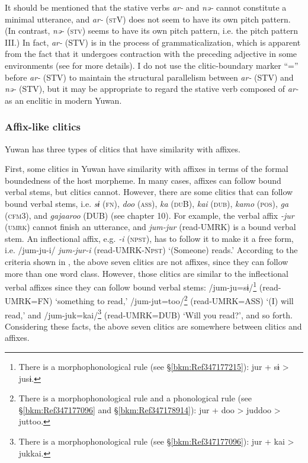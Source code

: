 It should be mentioned that the stative verbs \textit{ar-} and \textit{nə-} cannot constitute a minimal utterance, and \textit{ar-} (\textsc{st}V) does not seem to have its own pitch pattern. (In contrast, \textit{nə-} (\textsc{stv}) seems to have its own pitch pattern, i.e. the pitch pattern III.) In fact, \textit{ar-} (STV) is in the process of grammaticalization, which is apparent from the fact that it undergoes contraction with the preceding adjective in some environments (see  for more details). I do not use the clitic-boundary marker “=” before \textit{ar-} (STV) to maintain the structural parallelism between \textit{ar-} (STV) and \textit{nə-} (STV), but it may be appropriate to regard the stative verb composed of \textit{ar-} as an enclitic in modern Yuwan.

\subsubsection{Affix-like clitics}\label{sec:4.2.2.2}

Yuwan has three types of clitics that have similarity with affixes.

  First, some clitics in Yuwan have similarity with affixes in terms of the formal boundedness of the host morpheme. In many cases, affixes can follow bound verbal stems, but clitics cannot. However, there are some clitics that can follow bound verbal stems, i.e. \textit{sɨ} (\textsc{fn}), \textit{doo} (\textsc{ass}), \textit{ka} (\textsc{du}B), \textit{kai} (\textsc{dub}), \textit{kamo} (\textsc{pos}), \textit{ga} (\textsc{cfm}3), and \textit{gajaaroo} (DUB) (see chapter 10). For example, the verbal affix \textit{{}-jur} (\textsc{umrk}) cannot finish an utterance, and \textit{jum-jur} (read-UMRK) is a bound verbal stem. An inflectional affix, e.g. \textit{{}-i} (\textsc{npst}), has to follow it to make it a free form, i.e. /jum-ju-i/ \textit{jum-jur-i} (read-UMRK-N\textsc{pst}) ‘(Someone) reads.’ According to the criteria shown in , the above seven clitics are not affixes, since they can follow more than one word class. However, those clitics are similar to the inflectional verbal affixes since they can follow bound verbal stems: /jum-ju=sɨ/\footnote{There is a morphophonological rule (see §\ref{bkm:Ref347177215}): jur + sɨ > jusɨ.} (read-UMRK=FN) ‘something to read,’ /jum-jut=too/\footnote{There is a morphophonological rule and a phonological rule (see §\ref{bkm:Ref347177096} and §\ref{bkm:Ref347178914}): jur + doo > juddoo > juttoo.} (read-UMRK=ASS) ‘(I) will read,’ and /jum-juk=kai/\footnote{There is a morphophonological rule (see §\ref{bkm:Ref347177096}): jur + kai > jukkai.} (read-UMRK=DUB) ‘Will you read?’, and so forth. Considering these facts, the above seven clitics are somewhere between clitics and affixes.

